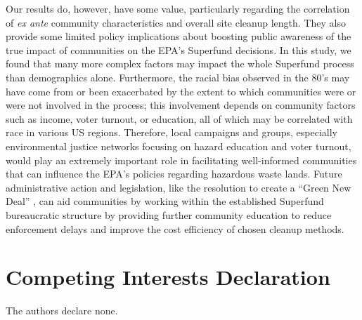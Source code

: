 \documentclass[12pt]{article}
\begin{document}
Our results do, however, have some value, particularly regarding the correlation of \textit{ex ante} community characteristics and overall site cleanup length. They also provide some limited policy implications about boosting public awareness of the true impact of communities on the EPA's Superfund decisions. In this study, we found that many more complex factors may impact the whole Superfund process than demographics alone. Furthermore, the racial bias observed in the 80's may have come from or been exacerbated by the extent to which communities were or were not involved in the process; this involvement depends on community factors such as income, voter turnout, or education, all of which may be correlated with race in various US regions. Therefore, local campaigns and groups, especially environmental justice networks focusing on hazard education and voter turnout, would play an extremely important role in facilitating well-informed communities that can influence the EPA's policies regarding hazardous waste lands. Future administrative action and legislation, like the resolution to create a ``Green New Deal'' \parencite{Ocasio-Cortez2019}, can aid communities by working within the established Superfund bureaucratic structure by providing further community education to reduce enforcement delays and improve the cost efficiency of chosen cleanup methods. 




\section*{Competing Interests Declaration}

The authors declare none. 

\renewcommand*{\bibfont}{\normalfont\small}
\printbibliography







\end{document}
